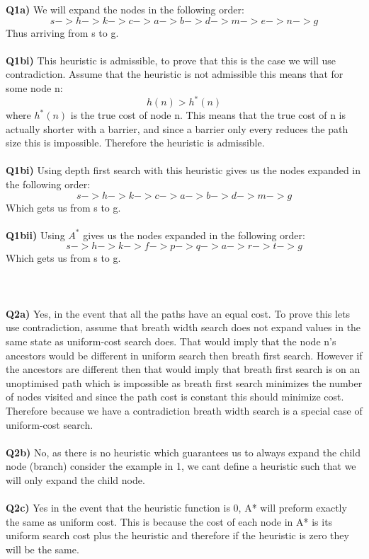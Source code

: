 \documentclass{article}
\begin{document}
\begin{titlepage}
\vspace{0.5cm}
\textbf{Q1a)} We will expand the nodes in the following order:
\[ s -> h -> k -> c -> a -> b -> d -> m -> e -> n -> g \]
Thus arriving from s to g.\\\\
\textbf{Q1bi)} This heuristic is admissible, to prove that this is the case we will use contradiction. Assume that the heuristic is not admissible this means that for some node n:
\[ h(n) > h^*(n) \]
where $h^*(n)$ is the true cost of node n. This means that the true cost of n is actually shorter with a barrier, and since a barrier only every reduces the path size this is impossible. Therefore the heuristic is admissible. \\\\
\textbf{Q1bi)} Using depth first search with this heuristic gives us the nodes expanded in the following order: \\
\[ s -> h -> k -> c -> a -> b -> d -> m -> g \]
Which gets us from s to g. \\\\
\textbf{Q1bii)} Using $A^*$ gives us the nodes expanded in the following order:  \\
\[ s -> h -> k -> f -> p -> q -> a -> r -> t -> g \]
Which gets us from s to g.\\\\\\\\
\textbf{Q2a)} Yes, in the event that all the paths have an equal cost. To prove this lets use contradiction, assume that breath width search does not expand values in the same state as uniform-cost  search does. That would imply that the node n's ancestors would be different in uniform search then breath first search. However if the ancestors are different then that would imply that breath first search is on an unoptimised path which is impossible as breath first search minimizes the number of nodes visited and since the path cost is constant this should minimize cost. Therefore because we have a contradiction breath width search is a special case of uniform-cost search.\\\\
\textbf{Q2b)} No, as there is no heuristic which guarantees us to always expand the child node (branch) consider the example in 1, we cant define a heuristic such that we will only expand the child node. \\\\
\textbf{Q2c)} Yes in the event that the heuristic function is 0, A* will preform exactly the same as uniform cost. This is because the cost of each node in A* is its uniform search cost plus the heuristic and therefore if the heuristic is zero they will be the same. 

\end{titlepage}
\end{document}
